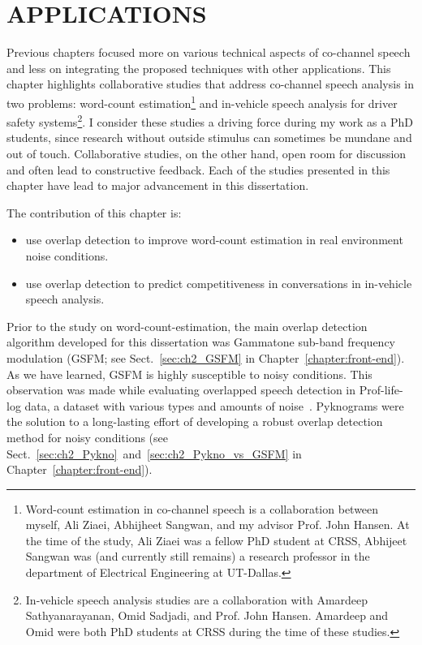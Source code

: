 \chapter{APPLICATIONS}
\label{chap:applications}

Previous chapters focused more on various technical aspects of co-channel speech and less on integrating the proposed techniques with other applications. 
This chapter highlights collaborative studies that address co-channel speech analysis in two problems: word-count estimation\footnote{Word-count estimation in co-channel speech is a collaboration between myself, Ali Ziaei, Abhijheet Sangwan, and my advisor Prof. John Hansen. At the time of the study, Ali Ziaei was a fellow PhD student at CRSS, Abhijeet Sangwan was (and currently still remains) a research professor in the department of Electrical Engineering at UT-Dallas.} and in-vehicle speech analysis for driver safety systems\footnote{In-vehicle speech analysis studies are a collaboration with Amardeep Sathyanarayanan, Omid Sadjadi, and Prof. John Hansen. Amardeep and Omid were both PhD students at CRSS during the time of these studies.}. 
I consider these studies a driving force during my work as a PhD students, since research without outside stimulus can sometimes be mundane and out of touch. 
Collaborative studies, on the other hand, open room for discussion and often lead to constructive feedback. 
Each of the studies presented in this chapter have lead to major advancement in this dissertation. 

The contribution of this chapter is:
\begin{itemize}
	\item use overlap detection to improve word-count estimation in real environment noise conditions. 
	\item use overlap detection to predict competitiveness in conversations in in-vehicle speech analysis. 
\end{itemize}
Prior to the study on word-count-estimation, the main overlap detection algorithm developed for this dissertation was Gammatone sub-band frequency modulation (GSFM; see Sect.~\ref{sec:ch2_GSFM} in Chapter~\ref{chapter:front-end}). As we have learned, GSFM is highly susceptible to noisy conditions. 
This observation was made while evaluating overlapped speech detection in Prof-life-log data, a dataset with various types and amounts of noise~\cite{ziaei2013prof}. 
Pyknograms were the solution to a long-lasting effort of developing a robust overlap detection method for noisy conditions (see Sect.~\ref{sec:ch2_Pykno}~and~\ref{sec:ch2_Pykno_vs_GSFM} in Chapter~\ref{chapter:front-end}). 

